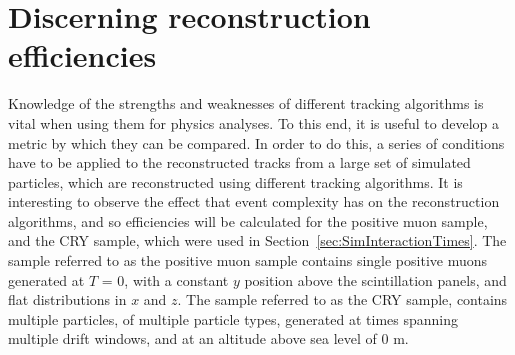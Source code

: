 \section{Discerning reconstruction efficiencies} \label{sec:SimRecoEffic} %
Knowledge of the strengths and weaknesses of different tracking algorithms is vital when using them for physics analyses. To this end, it is useful to develop a metric by which they can be compared. In order to do this, a series of conditions have to be applied to the reconstructed tracks from a large set of simulated particles, which are reconstructed using different tracking algorithms. It is interesting to observe the effect that event complexity has on the reconstruction algorithms, and so efficiencies will be calculated for the positive muon sample, and the CRY sample, which were used in Section~\ref{sec:SimInteractionTimes}. The sample referred to as the positive muon sample contains single positive muons generated at $T$ = 0, with a constant $y$ position above the scintillation panels, and flat distributions in $x$ and $z$. The sample referred to as the CRY sample, contains multiple particles, of multiple particle types, generated at times spanning multiple drift windows, and at an altitude above sea level of 0 m. \\

